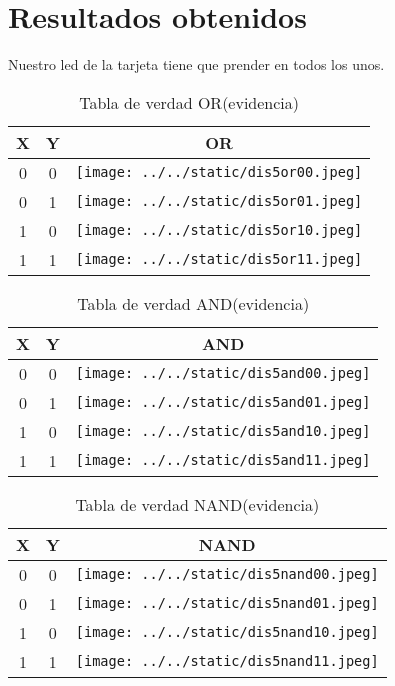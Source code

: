 \documentclass{article}
\begin{document}
\section{Resultados obtenidos}\label{sec:resObtenidos}
Nuestro led de la tarjeta tiene que prender en todos los unos.

\begin{table}[H]
	\centering
	\begin{tabular}{|c|c|c|}
		\hline
		X & Y & OR \\
		\hline
		0 & 0 & \texttt{[image: ../../static/dis5or00.jpeg]} \\	
		\hline
		0 & 1 &  \texttt{[image: ../../static/dis5or01.jpeg]}\\
	\hline
	1 & 0 &  \texttt{[image: ../../static/dis5or10.jpeg]}\\
	\hline
	1 & 1 &  \texttt{[image: ../../static/dis5or11.jpeg]}\\
	\hline
\end{tabular}
\caption{Tabla de verdad OR(evidencia)}
\label{table:6}
\end{table}

\begin{table}[H]
	\centering
	\begin{tabular}{|c|c|c|}
		\hline
		X & Y & AND \\
		\hline
		0 & 0 & \texttt{[image: ../../static/dis5and00.jpeg]} \\	
		\hline
		0 & 1 &  \texttt{[image: ../../static/dis5and01.jpeg]} \\
	\hline
	1 & 0 &  \texttt{[image: ../../static/dis5and10.jpeg]}\\
	\hline
	1 & 1 &  \texttt{[image: ../../static/dis5and11.jpeg]}\\
	\hline
\end{tabular}
\caption{Tabla de verdad AND(evidencia)}
\label{table:7}
\end{table}

\begin{table}[H]
	\centering
	\begin{tabular}{|c|c|c|}
		\hline
		X & Y & NAND \\
		\hline
		0 & 0 & \texttt{[image: ../../static/dis5nand00.jpeg]} \\	
		\hline
		0 & 1 & \texttt{[image: ../../static/dis5nand01.jpeg]} \\
	\hline
	1 & 0 &  \texttt{[image: ../../static/dis5nand10.jpeg]}\\
	\hline
	1 & 1 &  \texttt{[image: ../../static/dis5nand11.jpeg]}\\
	\hline
\end{tabular}
\caption{Tabla de verdad NAND(evidencia)}
\label{table:8}
\end{table}
\end{document}
